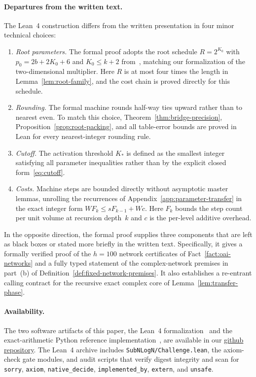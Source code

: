 \paragraph{Departures from the written text.}
The Lean~4 construction differs from the written presentation in four minor technical choices:
\begin{enumerate}[label=(\arabic*),leftmargin=*,itemsep=2pt]
\item \emph{Root parameters.} The formal proof adopts the root schedule $R=2^{K_0}$ with $p_0=2b+2K_0+6$ and $K_0\le k+2$ from~\cite{MS}, matching our formalization of the two-dimensional multiplier. Here $R$ is at most four times the length in Lemma~\ref{lem:root-family}, and the cost chain is proved directly for this schedule.

\item \emph{Rounding.} The formal machine rounds half-way ties upward rather than to nearest even. To match this choice, Theorem~\ref{thm:bridge-precision}, Proposition~\ref{prop:root-packing}, and all table-error bounds are proved in Lean for every nearest-integer rounding rule.

\item \emph{Cutoff.} The activation threshold $K_*$ is defined as the smallest integer satisfying all parameter inequalities rather than by the explicit closed form~\eqref{eq:cutoff}.

\item \emph{Costs.} Machine steps are bounded directly without asymptotic master lemmas, unrolling the recurrences of Appendix~\ref{app:parameter-transfer} in the exact integer form $W F_k \le s F_{k-1} + W c$. Here $F_k$ bounds the step count per unit volume at recursion depth~$k$ and $c$ is the per-level additive overhead.
\end{enumerate}

In the opposite direction, the formal proof supplies three components that are left as black boxes or stated more briefly in the written text. Specifically, it gives a formally verified proof of the $h=100$ network certificates of Fact~\ref{fact:oai-networks} and a fully typed statement of the complex-network premises in part~(b) of Definition~\ref{def:fixed-network-premises}. It also establishes a re-entrant calling contract for the recursive exact complex core of Lemma~\ref{lem:transfer-phase}.

\paragraph{Availability.}
The two software artifacts of this paper, the Lean~4 formalization~\cite{Lean26} and the exact-arithmetic Python reference implementation~\cite{Code26}, are available in our \href{https://github.com/lockqueue/intmul}{github repository}. The Lean~4 archive includes \texttt{SubNLogN/Challenge.lean}, the axiom-check gate modules, and audit scripts that verify digest integrity and scan for \texttt{sorry}, \texttt{axiom}, \texttt{native\_decide}, \texttt{implemented\_by}, \texttt{extern}, and \texttt{unsafe}.

